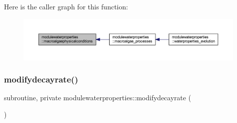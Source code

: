 Here is the caller graph for this function\+:\nopagebreak
\begin{figure}[H]
\begin{center}
\leavevmode
\includegraphics[width=350pt]{namespacemodulewaterproperties_af4c3f5f2d82b97b5112ee2c44f4dc5a3_icgraph}
\end{center}
\end{figure}
\mbox{\label{namespacemodulewaterproperties_a5d19c5c0edd1b4706080cd0259456cd8}} 
\subsubsection{\texorpdfstring{modifydecayrate()}{modifydecayrate()}}
{\footnotesize\ttfamily subroutine, private modulewaterproperties\+::modifydecayrate (\begin{DoxyParamCaption}{ }\end{DoxyParamCaption})\hspace{0.3cm}{\ttfamily [private]}}

